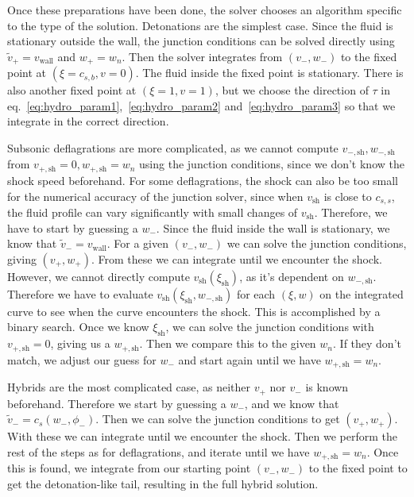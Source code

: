 Once these preparations have been done,
the solver chooses an algorithm specific to the type of the solution.
Detonations are the simplest case.
Since the fluid is stationary outside the wall,
the junction conditions can be solved directly using
$\tilde{v}_+ = v_\text{wall}$ and $w_+ = w_n$.
Then the solver integrates from $(v_-, w_-)$ to the fixed point at $(\xi=c_{s,b}, v=0)$.
The fluid inside the fixed point is stationary.
There is also another fixed point at $(\xi=1, v=1)$, but we choose the direction of $\tau$ in eq.~\eqref{eq:hydro_param1},~\eqref{eq:hydro_param2} and~\eqref{eq:hydro_param3} so that we integrate in the correct direction.

Subsonic deflagrations are more complicated,
as we cannot compute $v_{-,\text{sh}}, w_{-,\text{sh}}$ from $v_{+,\text{sh}}=0, w_{+,\text{sh}}=w_n$ using the junction conditions,
since we don't know the shock speed beforehand.
For some deflagrations, the shock can also be too small for the numerical accuracy of the junction solver,
since when $v_\text{sh}$ is close to $c_{s,s}$, the fluid profile can vary significantly with small changes of $v_\text{sh}$.
Therefore, we have to start by guessing a $w_-$.
Since the fluid inside the wall is stationary, we know that $\tilde{v}_- = v_{\text{wall}}$.
For a given $(v_-, w_-)$ we can solve the junction conditions, giving $(v_+, w_+)$.
From these we can integrate until we encounter the shock.
However, we cannot directly compute $v_\text{sh}(\xi_\text{sh})$, as it's dependent on $w_{-,\text{sh}}$.
Therefore we have to evaluate $v_\text{sh}(\xi_\text{sh}, w_{-,\text{sh}})$ for each $(\xi, w)$ on the integrated curve to see
when the curve encounters the shock.
This is accomplished by a binary search.
Once we know $\xi_\text{sh}$, we can solve the junction conditions with $v_{+,\text{sh}} = 0$, giving us a $w_{+,\text{sh}}$.
Then we compare this to the given $w_n$.
If they don't match, we adjust our guess for $w_-$ and start again until we have $w_{+,\text{sh}} = w_n$.

Hybrids are the most complicated case, as neither $v_+$ nor $v_-$ is known beforehand.
Therefore we start by guessing a $w_-$, and we know that $\tilde{v}_- = c_s(w_-, \phi_-)$.
Then we can solve the junction conditions to get $(v_+, w_+)$.
With these we can integrate until we encounter the shock.
Then we perform the rest of the steps as for deflagrations, and iterate until we have $w_{+,\text{sh}} = w_n$.
Once this is found, we integrate from our starting point $(v_-, w_-)$ to the fixed point to get the detonation-like tail,
resulting in the full hybrid solution.

